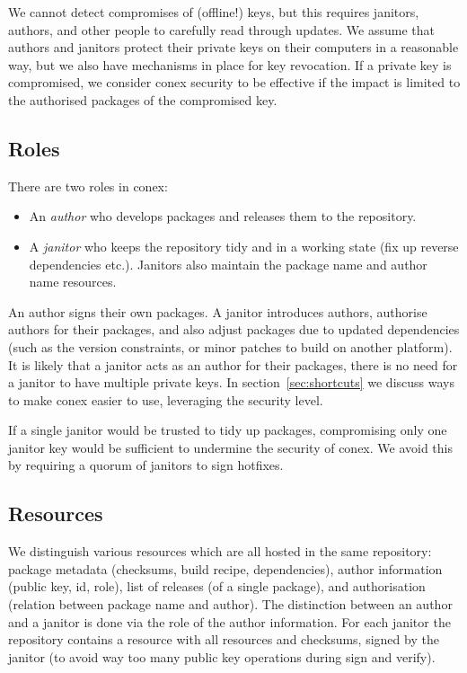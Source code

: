 \documentclass[nocopyrightspace]{sigplanconf}
\begin{document}

We cannot detect compromises of (offline!) keys, but this requires janitors, authors, and other people to carefully read through updates.
We assume that authors and janitors protect their private keys on their computers in a reasonable way, but we also have mechanisms in place for key revocation.
If a private key is compromised, we consider conex security to be effective if the impact is limited to the authorised packages of the compromised key.

\subsection{Roles}
There are two roles in conex:
\begin{itemize}
  \item An \emph{author} who develops packages and releases them to the repository.
  \item A \emph{janitor} who keeps the repository tidy and in a working state (fix up reverse dependencies etc.).  Janitors also maintain the package name and author name resources.
\end{itemize}

An author signs their own packages.
A janitor introduces authors, authorise authors for their packages, and also adjust packages due to updated dependencies (such as the version constraints, or minor patches to build on another platform).
It is likely that a janitor acts as an author for their packages, there is no need for a janitor to have multiple private keys.
In section~\ref{sec:shortcuts} we discuss ways to make conex easier to use, leveraging the security level.

If a single janitor would be trusted to tidy up packages, compromising only one janitor key would be sufficient to undermine the security of conex.
We avoid this by requiring a quorum of janitors to sign hotfixes.

\subsection{Resources}
We distinguish various resources which are all hosted in the same repository:
package metadata (checksums, build recipe, dependencies), author information (public key, id, role), list of releases (of a single package), and authorisation (relation between package name and author).
The distinction between an author and a janitor is done via the role of the author information.
For each janitor the repository contains a resource with all resources and checksums, signed by the janitor (to avoid way too many public key operations during sign and verify).
\end{document}
